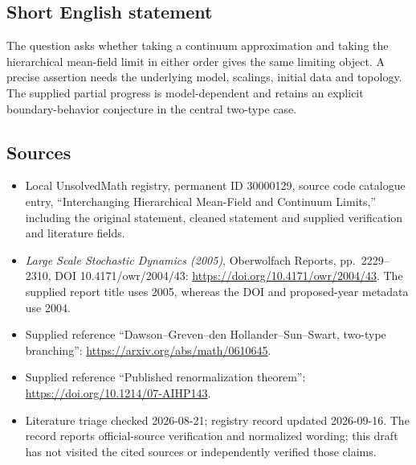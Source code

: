 \documentclass[11pt]{article}
\begin{document}
\subsection{Short English statement}
The question asks whether taking a continuum approximation and taking the hierarchical mean-field limit in either order gives the same limiting object. A precise assertion needs the underlying model, scalings, initial data and topology. The supplied partial progress is model-dependent and retains an explicit boundary-behavior conjecture in the central two-type case.
\subsection{Sources}
\begin{itemize}
\item Local UnsolvedMath registry, permanent ID 30000129, source code catalogue entry, ``Interchanging Hierarchical Mean-Field and Continuum Limits,'' including the original statement, cleaned statement and supplied verification and literature fields.
\item \emph{Large Scale Stochastic Dynamics (2005)}, Oberwolfach Reports, pp.\ 2229--2310, DOI 10.4171/owr/2004/43: \url{https://doi.org/10.4171/owr/2004/43}. The supplied report title uses 2005, whereas the DOI and proposed-year metadata use 2004.
\item Supplied reference ``Dawson--Greven--den Hollander--Sun--Swart, two-type branching'': \url{https://arxiv.org/abs/math/0610645}.
\item Supplied reference ``Published renormalization theorem'': \url{https://doi.org/10.1214/07-AIHP143}.
\item Literature triage checked 2026-08-21; registry record updated 2026-09-16. The record reports official-source verification and normalized wording; this draft has not visited the cited sources or independently verified those claims.
\end{itemize}
\end{document}
